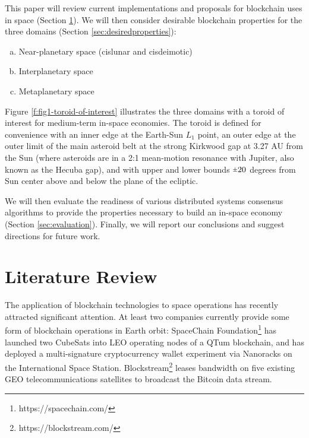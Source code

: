 \documentclass[]{aiaa-tc}%
\newcommand{\rpm}{\raisebox{.2ex}{$\scriptstyle\pm$}} %
\begin{document}
This paper will review current implementations and proposals for blockchain uses in space (Section \ref{sec:litreview}). We will then consider desirable blockchain properties for the three domains (Section \ref{sec:desiredproperties}): 
\begin{enumerate}[(a)] %
\item Near-planetary space (cislunar and cisdeimotic)
\item Interplanetary space
\item Metaplanetary space
\end{enumerate}

Figure \ref{f:fig1-toroid-of-interest} illustrates the three domains with a toroid of interest for medium-term in-space economies. The toroid is defined for convenience with an inner edge at the Earth-Sun $L_{1}$ point, an outer edge at the outer limit of the main asteroid belt at the strong Kirkwood gap at 3.27 AU from the Sun (where asteroids are in a 2:1 mean-motion resonance with Jupiter, also known as the Hecuba gap), and with upper and lower bounds $\rpm 20$ degrees from Sun center above and below the plane of the ecliptic.

We will then evaluate the readiness of various distributed systems consensus algorithms to provide the properties necessary to build an in-space economy (Section \ref{sec:evaluation}). Finally, we will report our conclusions and suggest directions for future work.


\section{Literature Review}\label{sec:litreview}

The application of blockchain technologies to space operations has recently attracted significant attention. At least two companies currently provide some form of blockchain operations in Earth orbit: SpaceChain Foundation\footnote{https://spacechain.com/} has launched two CubeSats into LEO operating nodes of a QTum blockchain, and has deployed a multi-signature cryptocurrency wallet experiment via Nanoracks on the International Space Station. Blockstream\footnote{https://blockstream.com/} leases bandwidth on five existing GEO telecommunications satellites to broadcast the Bitcoin data stream.
\end{document}
